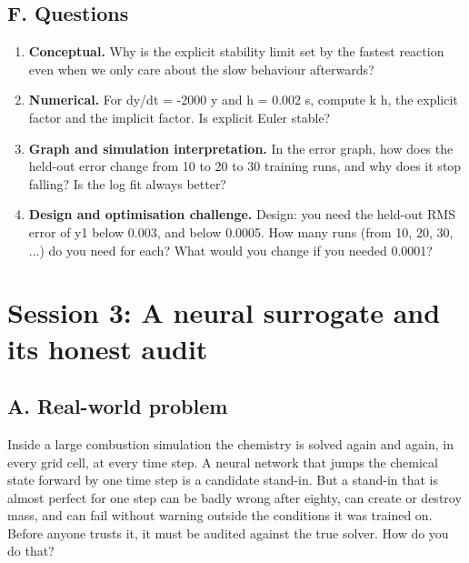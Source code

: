 \documentclass[11pt,a4paper]{article}
\begin{document}
\subsection*{F. Questions}
\begin{enumerate}[nosep]
\item \textbf{Conceptual.} Why is the explicit stability limit set by the fastest reaction even when we only care about the slow behaviour afterwards?
\item \textbf{Numerical.} For dy/dt = -2000 y and h = 0.002 s, compute k h, the explicit factor and the implicit factor. Is explicit Euler stable?
\item \textbf{Graph and simulation interpretation.} In the error graph, how does the held-out error change from 10 to 20 to 30 training runs, and why does it stop falling? Is the log fit always better?
\item \textbf{Design and optimisation challenge.} Design: you need the held-out RMS error of y1 below 0.003, and below 0.0005. How many runs (from 10, 20, 30, ...) do you need for each? What would you change if you needed 0.0001?
\end{enumerate}

\section{Session 3: A neural surrogate and its honest audit}

\subsection*{A. Real-world problem}
Inside a large combustion simulation the chemistry is solved again and again, in every grid cell, at every time step. A neural network that jumps the chemical state forward by one time step is a candidate stand-in. But a stand-in that is almost perfect for one step can be badly wrong after eighty, can create or destroy mass, and can fail without warning outside the conditions it was trained on. Before anyone trusts it, it must be audited against the true solver. How do you do that?
\end{document}
